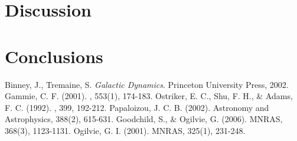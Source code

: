 \documentclass[apj]{emulateapj}
\begin{document}
\section{Discussion}


\section{Conclusions}

\begin{thebibliography}{}
 Binney, J., Tremaine, S. \emph{Galactic Dynamics}. Princeton University Press, 2002.
 Gammie, C. F. (2001). \apj, 553(1), 174-183. 
 Ostriker, E. C., Shu, F. H., \& Adams, F. C. (1992). \apj, 399, 192-212. 
 Papaloizou, J. C. B. (2002). Astronomy and Astrophysics, 388(2), 615-631. 
 Goodchild, S., \& Ogilvie, G. (2006). MNRAS, 368(3), 1123-1131. 
 Ogilvie, G. I. (2001). MNRAS, 325(1), 231-248. 
\end{thebibliography}
\end{document}

